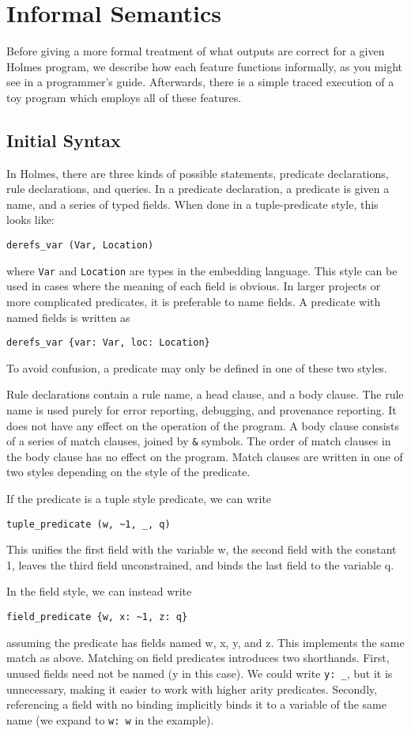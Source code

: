 \section{Informal Semantics}
Before giving a more formal treatment of what outputs are correct for a given Holmes program, we describe how each feature functions informally, as you might see in a programmer's guide.
Afterwards, there is a simple traced execution of a toy program which employs all of these features.
\subsection{Initial Syntax}
In Holmes, there are three kinds of possible statements, predicate declarations, rule declarations, and queries.
In a predicate declaration, a predicate is given a name, and a series of typed fields.
When done in a tuple-predicate style, this looks like:
\begin{verbatim}
derefs_var (Var, Location)
\end{verbatim}
where \texttt{Var} and \texttt{Location} are types in the embedding language.
This style can be used in cases where the meaning of each field is obvious.
In larger projects or more complicated predicates, it is preferable to name fields.
A predicate with named fields is written as
\begin{verbatim}
derefs_var {var: Var, loc: Location}
\end{verbatim}
To avoid confusion, a predicate may only be defined in one of these two styles.

Rule declarations contain a rule name, a head clause, and a body clause.
The rule name is used purely for error reporting, debugging, and provenance reporting.
It does not have any effect on the operation of the program.
A body clause consists of a series of match clauses, joined by \texttt{\&} symbols.
The order of match clauses in the body clause has no effect on the program.
Match clauses are written in one of two styles depending on the style of the predicate.

If the predicate is a tuple style predicate, we can write
\begin{verbatim}
tuple_predicate (w, ~1, _, q)
\end{verbatim}
This unifies the first field with the variable w, the second field with the constant 1, leaves the third field unconstrained, and binds the last field to the variable q.

In the field style, we can instead write
\begin{verbatim}
field_predicate {w, x: ~1, z: q}
\end{verbatim}
assuming the predicate has fields named w, x, y, and z.
This implements the same match as above.
Matching on field predicates introduces two shorthands.
First, unused fields need not be named (y in this case).
We could write \texttt{y: \_}, but it is unnecessary, making it easier to work with higher arity predicates.
Secondly, referencing a field with no binding implicitly binds it to a variable of the same name (we expand to \texttt{w: w} in the example).

